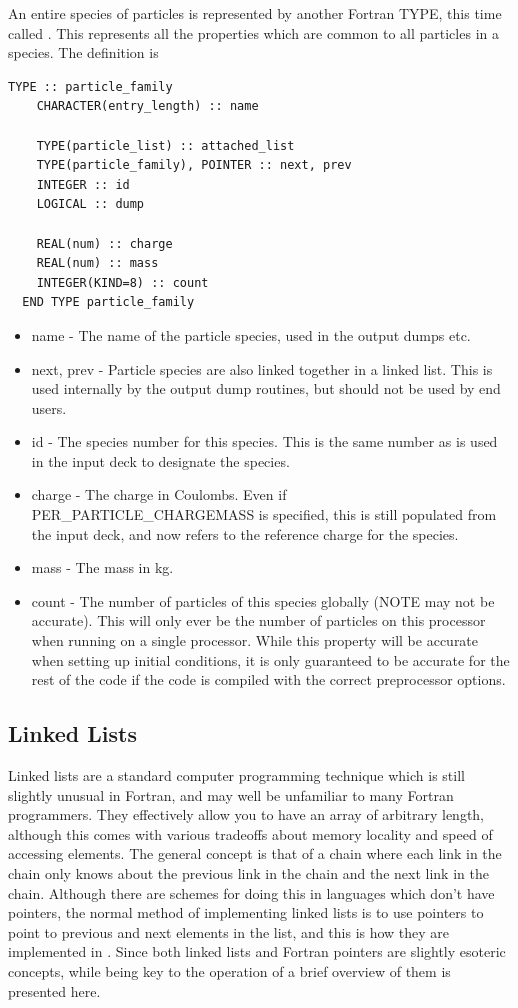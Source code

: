 \documentclass[12pt,a4paper]{article}
\newcommand{\simpleboxverbatim}{\begin{Verbatim}[obeytabs=true,frame=single,
  framerule=0.5mm,rulecolor=\color{warwickmid},formatcom=\color{black}]}
\newcommand{\inlinecode}[1]{{\color{warwickred} \bf\texttt{#1}}}
\newcommand{\EPOCH}{{\color{warwickdark}\fontfamily{phv}\selectfont{EPOCH}}}
\begin{document}
An entire species of particles is represented by another Fortran TYPE, this
time called \linebreak\inlinecode{particle\_family}. This represents all the properties
which are common to all particles in a species. The definition is

\simpleboxverbatim
  TYPE :: particle_family
    CHARACTER(entry_length) :: name

    TYPE(particle_list) :: attached_list
    TYPE(particle_family), POINTER :: next, prev
    INTEGER :: id
    LOGICAL :: dump

    REAL(num) :: charge
    REAL(num) :: mass
    INTEGER(KIND=8) :: count
  END TYPE particle_family
\end{Verbatim}

\begin{itemize}
\item name - The name of the particle species, used in the output dumps etc.
\item next, prev - Particle species are also linked together in a linked
  list. This is used internally by the output dump routines, but should not be
  used by end users.
\item id - The species number for this species. This is the same number as is
  used in the input deck to designate the species.
\item charge - The charge in Coulombs. Even if PER\_PARTICLE\_CHARGEMASS is
  specified, this is still populated from the input deck, and now refers to
  the reference charge for the species.
\item mass - The mass in kg.
\item count - The number of particles of this species globally (NOTE may not
  be accurate). This will only ever be the number of particles on this
  processor when running on a single processor. While this property will be
  accurate when setting up initial conditions, it is only guaranteed to be
  accurate for the rest of the code if the code is compiled with the correct
  preprocessor options.
\end{itemize}

\subsection{Linked Lists}
Linked lists are a standard computer programming technique which is still
slightly unusual in Fortran, and may well be unfamiliar to many Fortran
programmers. They effectively allow you to have an array of arbitrary length,
although this comes with various tradeoffs about memory locality and speed of
accessing elements. The general concept is that of a chain where each link in
the chain only knows about the previous link in the chain and the next link in
the chain. Although there are schemes for doing this in languages which don't
have pointers, the normal method of implementing linked lists is to use
pointers to point to previous and next elements in the list, and this is how
they are implemented in \EPOCH. Since both linked lists and Fortran pointers
are slightly esoteric concepts, while being key to the operation of {\EPOCH} a
brief overview of them is presented here.\\
\end{document}
